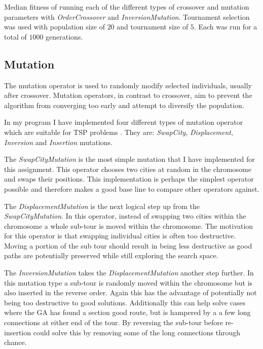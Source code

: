 \documentclass[journal]{IEEEtran}
\begin{document}
\begin{table}[t]
\centering

\caption{Median fitness of running each of the different types of crossover and mutation parameters with \textit{OrderCrossover} and \textit{InversionMutation}. Tournament selection was used with population size of $20$ and tournament size of $5$. Each was run for a total of $1000$ generations.}
\label{table:cross-vs-mutate-params}
\end{table}


\subsection{Mutation}
The mutation operator is used to randomly modify selected individuals, usually after crossover. Mutation operators, in contrast to crossover, aim to prevent the algorithm from converging too early and attempt to diversify the population.

In my program I have implemented four different types of mutation operator which are suitable for TSP problems \cite{larranaga1999genetic}. They are: \textit{SwapCity}, \textit{Displacement}, \textit{Inversion} and \textit{Insertion} mutations.

The \textit{SwapCityMutation} is the most simple mutation that I have implemented for this assignment. This operator chooses two cities at random in the chromosome and swaps their positions. This implementation is perhaps the simplest operator possible and therefore makes a good base line to compare other operators against.

The \textit{DisplacementMutation} is the next logical step up from the \textit{SwapCityMutation}. In this operator, instead of swapping two cities within the chromosome a whole sub-tour is moved within the chromosome. The motivation for this operator is that swapping individual cities is often too destructive. Moving a portion of the sub tour should result in being less destructive as good paths are potentially preserved while still exploring the search space.

The \textit{InversionMutation} takes the \textit{DisplacementMutation} another step further. In this mutation type a sub-tour is randomly moved within the chromosome but is also inserted in the reverse order. Again this has the advantage of potentially not being too destructive to good solutions. Additionally this can help solve cases where the GA has found a section good route, but is hampered by a a few long connections at either end of the tour. By reversing the sub-tour before re-insertion could solve this by removing some of the long connections through chance.
\end{document}
